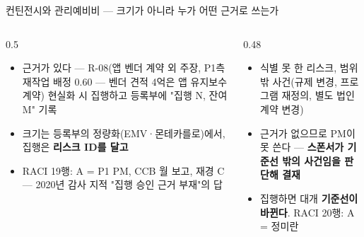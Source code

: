 \begin{frame}{컨틴전시와 관리예비비 — 크기가 아니라 누가 어떤 근거로 쓰는가}
\begin{columns}[T]
\begin{column}{0.5\textwidth}
\begin{itemize}
\item 근거가 있다 — R-08(앱 벤더 계약 외 주장, P1측 재작업 배정 0.60 — 벤더 견적 4억은 앱 유지보수 계약) 현실화 시 집행하고 등록부에 "집행 N, 잔여 M" 기록
\item 크기는 등록부의 정량화(EMV·몬테카를로)에서, 집행은 \textbf{리스크 ID를 달고}
\item RACI 19행: A = P1 PM, CCB 월 보고, 재경 C — 2020년 감사 지적 "집행 승인 근거 부재"의 답
\end{itemize}
\end{column}
\begin{column}{0.48\textwidth}
\begin{itemize}
\item 식별 못 한 리스크, 범위 밖 사건(규제 변경, 프로그램 재정의, 별도 법인 계약 변경)
\item 근거가 없으므로 PM이 못 쓴다 — \textbf{스폰서가 기준선 밖의 사건임을 판단해 결재}
\item 집행하면 대개 \textbf{기준선이 바뀐다}. RACI 20행: A = 정미란
\end{itemize}
\end{column}
\end{columns}
\end{frame}

